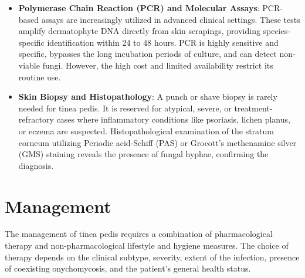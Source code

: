 \begin{itemize}
    \item \textbf{Polymerase Chain Reaction (PCR) and Molecular Assays}: PCR-based assays are increasingly utilized in advanced clinical settings. These tests amplify dermatophyte DNA directly from skin scrapings, providing species-specific identification within 24 to 48 hours. PCR is highly sensitive and specific, bypasses the long incubation periods of culture, and can detect non-viable fungi. However, the high cost and limited availability restrict its routine use.
    \item \textbf{Skin Biopsy and Histopathology}: A punch or shave biopsy is rarely needed for tinea pedis. It is reserved for atypical, severe, or treatment-refractory cases where inflammatory conditions like psoriasis, lichen planus, or eczema are suspected. Histopathological examination of the stratum corneum utilizing Periodic acid-Schiff (PAS) or Grocott's methenamine silver (GMS) staining reveals the presence of fungal hyphae, confirming the diagnosis.
\end{itemize}

\section*{Management}
The management of tinea pedis requires a combination of pharmacological therapy and non-pharmacological lifestyle and hygiene measures. The choice of therapy depends on the clinical subtype, severity, extent of the infection, presence of coexisting onychomycosis, and the patient's general health status.

